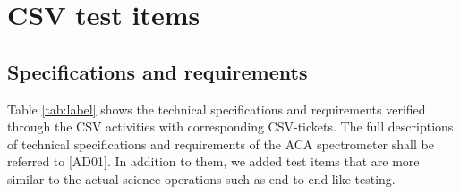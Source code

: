 
\section{CSV test items}

\subsection{Specifications and requirements}\label{sec:spec}
Table \ref{tab:label}  shows the technical specifications and requirements verified through the CSV activities with corresponding CSV-tickets. The full descriptions of technical specifications and requirements of the ACA spectrometer shall be referred to [AD01].  In addition to them, we added test items that are more similar to the actual science operations such as end-to-end like testing.

